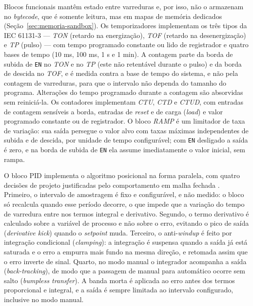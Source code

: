 Blocos funcionais mantêm estado entre varreduras e, por isso, não o armazenam no \textit{bytecode}, que é somente leitura, mas em mapas de memória dedicados (Seção~\ref{sec:memoria-sandbox}).
Os temporizadores implementam os três tipos da IEC 61131-3 --- \textit{TON} (retardo na energização), \textit{TOF} (retardo na desenergização) e \textit{TP} (pulso) --- com tempo programado constante ou lido de registrador e quatro bases de tempo (10 ms, 100 ms, 1 s e 1 min).
A contagem parte da borda de subida de \texttt{EN} no \textit{TON} e no \textit{TP} (este não retentável durante o pulso) e da borda de descida no \textit{TOF}, e é medida contra a base de tempo do sistema, e não pela contagem de varreduras, para que o intervalo não dependa do tamanho do programa.
Alterações do tempo programado durante a contagem são absorvidas sem reiniciá-la.
Os contadores implementam \textit{CTU}, \textit{CTD} e \textit{CTUD}, com entradas de contagem sensíveis a borda, entradas de \textit{reset} e de carga (\textit{load}) e valor programado constante ou de registrador.
O bloco \textit{RAMP} é um limitador de taxa de variação: sua saída persegue o valor alvo com taxas máximas independentes de subida e de descida, por unidade de tempo configurável; com \texttt{EN} desligado a saída é zero, e na borda de subida de \texttt{EN} ela assume imediatamente o valor inicial, sem rampa.

O bloco PID implementa o algoritmo posicional na forma paralela, com quatro decisões de projeto justificadas pelo comportamento em malha fechada \cite{astrom:2006}.
Primeiro, o intervalo de amostragem é fixo e configurável, e não medido: o bloco só recalcula quando esse período decorre, o que impede que a variação do tempo de varredura entre nos termos integral e derivativo.
Segundo, o termo derivativo é calculado sobre a variável de processo e não sobre o erro, evitando o pico de saída (\textit{derivative kick}) quando o \textit{setpoint} muda.
Terceiro, o anti-\textit{windup} é feito por integração condicional (\textit{clamping}): a integração é suspensa quando a saída já está saturada e o erro a empurra mais fundo na mesma direção, e retomada assim que o erro inverte de sinal.
Quarto, no modo manual o integrador acompanha a saída (\textit{back-tracking}), de modo que a passagem de manual para automático ocorre sem salto (\textit{bumpless transfer}).
A banda morta é aplicada ao erro antes dos termos proporcional e integral, e a saída é sempre limitada ao intervalo configurado, inclusive no modo manual.


